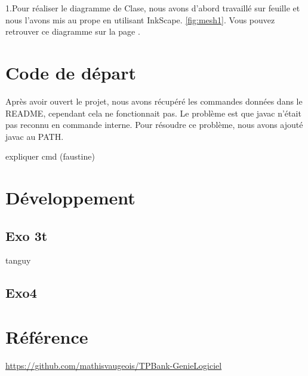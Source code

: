 \documentclass{article}
\begin{document}


1.Pour réaliser le diagramme de Clase, nous avons d'abord travaillé sur feuille et nous l'avons mis au prope en utilisant InkScape.  \ref{fig:mesh1}. Vous pouvez retrouver ce diagramme sur la page \pageref{fig:mesh1}.
\newline
\newpage
\section{Code de départ}
Après avoir ouvert le projet, nous avons récupéré les commandes données dans le README, cependant cela ne fonctionnait pas.
 Le problème est que javac n'était pas reconnu en commande interne. Pour résoudre ce problème, nous avons ajouté javac au PATH.

expliquer cmd (faustine)
\newpage
\section{Développement}
\subsection{Exo 3t}
tanguy
\subsection{Exo4}
\newpage
\section*{Référence}
\url{https://github.com/mathisvaugeois/TPBank-GenieLogiciel}
\end{document}
